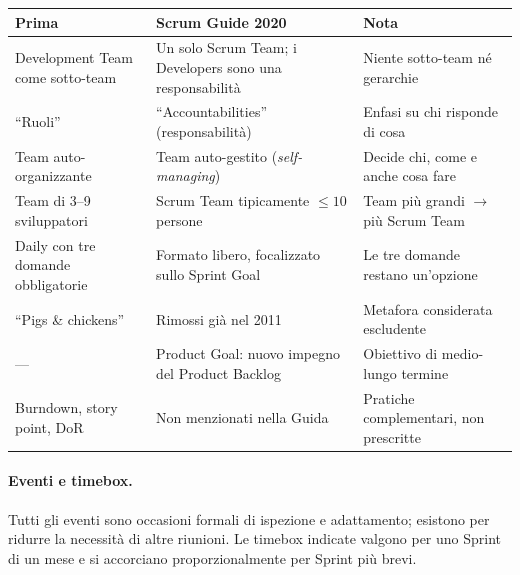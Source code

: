 \documentclass[12pt]{extarticle}
\begin{document}
\begin{center}
\small
\begin{tabular}{p{3.2cm}p{5.4cm}p{6.4cm}}
    \toprule
    \textbf{Prima} & \textbf{Scrum Guide 2020} & \textbf{Nota} \\
    \midrule
    Development Team come sotto-team & Un solo Scrum Team; i Developers sono una responsabilità & Niente sotto-team né gerarchie \\
    \addlinespace
    ``Ruoli'' & ``Accountabilities'' (responsabilità) & Enfasi su chi risponde di cosa \\
    \addlinespace
    Team auto-organizzante & Team auto-gestito (\textit{self-managing}) & Decide chi, come e anche cosa fare \\
    \addlinespace
    Team di 3--9 sviluppatori & Scrum Team tipicamente $\leq 10$ persone & Team più grandi $\to$ più Scrum Team \\
    \addlinespace
    Daily con tre domande obbligatorie & Formato libero, focalizzato sullo Sprint Goal & Le tre domande restano un'opzione \\
    \addlinespace
    ``Pigs \& chickens'' & Rimossi già nel 2011 & Metafora considerata escludente \\
    \addlinespace
    --- & Product Goal: nuovo impegno del Product Backlog & Obiettivo di medio-lungo termine \\
    \addlinespace
    Burndown, story point, DoR & Non menzionati nella Guida & Pratiche complementari, non prescritte \\
    \bottomrule
\end{tabular}
\end{center}

\paragraph{Eventi e timebox.}
Tutti gli eventi sono occasioni formali di ispezione e adattamento; esistono per ridurre la necessità di altre riunioni. Le timebox indicate valgono per uno Sprint di un mese e si accorciano proporzionalmente per Sprint più brevi.
\end{document}
